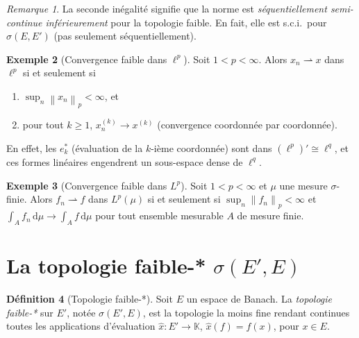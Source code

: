 \documentclass[a4paper,12pt]{book}
\newcommand{\K}{\mathbb{K}}
\newcommand{\dd}{\mathrm{d}}
\newcommand{\norm}[1]{\left\| #1 \right\|}
\newcommand{\weakto}{\rightharpoonup}
\theoremstyle{definition}
\newtheorem{definition}{Définition}[chapter]
\newtheorem{exemple}[definition]{Exemple}
\theoremstyle{plain}
\theoremstyle{remark}
\newtheorem{remarque}[definition]{Remarque}
\begin{document}
\begin{remarque}
\label{rem:norme-sci-faible}
La seconde inégalité signifie que la norme est \emph{séquentiellement semi-continue
inférieurement} pour la topologie faible.
En fait, elle est s.c.i.\ pour $\sigma(E,E')$ (pas seulement séquentiellement).
\end{remarque}

\begin{exemple}[Convergence faible dans $\ell^p$]
\label{ex:conv-faible-lp}
Soit $1 < p < \infty$. Alors $x_n \weakto x$ dans $\ell^p$ si et seulement si
\begin{enumerate}[label=(\roman*)]
  \item $\sup_n \norm{x_n}_p < \infty$, et
  \item pour tout $k \ge 1$, $x_n^{(k)} \to x^{(k)}$ (convergence coordonnée par coordonnée).
\end{enumerate}
En effet, les $e_k^*$ (évaluation de la $k$-ième coordonnée) sont dans $(\ell^p)' \cong \ell^q$,
et ces formes linéaires engendrent un sous-espace dense de $\ell^q$.
\end{exemple}

\begin{exemple}[Convergence faible dans $L^p$]
\label{ex:conv-faible-Lp}
Soit $1 < p < \infty$ et $\mu$ une mesure $\sigma$-finie. Alors $f_n \weakto f$ dans
$L^p(\mu)$ si et seulement si $\sup_n \norm{f_n}_p < \infty$ et
$\int_A f_n \, \dd\mu \to \int_A f \, \dd\mu$ pour tout ensemble mesurable $A$ de
mesure finie.
\end{exemple}


\section{La topologie faible-* $\sigma(E', E)$}
\label{sec:topo-faible-etoile}


\begin{definition}[Topologie faible-*]
\label{def:topo-faible-etoile}
Soit $E$ un espace de Banach. La \emph{topologie faible-*} sur $E'$, notée
$\sigma(E', E)$, est la topologie la moins fine rendant continues toutes les applications
d'évaluation $\hat{x} : E' \to \K$, $\hat{x}(f) = f(x)$, pour $x \in E$.
\end{definition}
\end{document}
